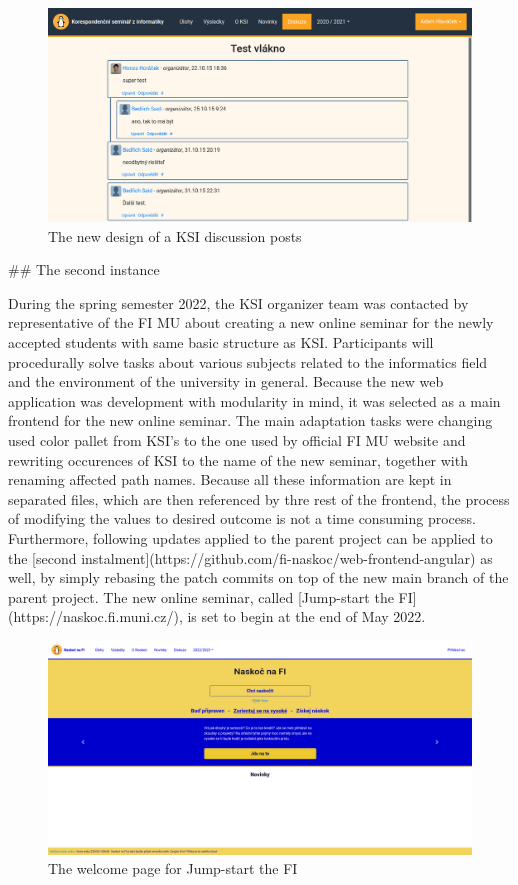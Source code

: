\documentclass[
  digital, %
  oneside, %
  lof,     %
  nolot,     %
]{fithesis4}
\begin{document}
{\begin{figure}
\includegraphics[width=\textwidth]{assets/img/discussion-new}
\caption{The new design of a KSI discussion posts}
\label{fig:discuss-new}
\end{figure}

## The second instance

During the spring semester 2022, the KSI organizer team was contacted by representative of the FI MU about creating a new online seminar for the newly accepted students with same basic structure as KSI. Participants will procedurally solve tasks about various subjects related to the informatics field and the environment of the university in general. Because the new web application was development with modularity in mind, it was selected as a main frontend for the new online seminar. The main adaptation tasks were changing used color pallet from KSI's to the one used by official FI MU website and rewriting occurences of KSI to the name of the new seminar, together with renaming affected path names. Because all these information are kept in separated files, which are then referenced by thre rest of the frontend, the process of modifying the values to desired outcome is not a time consuming process. Furthermore, following updates applied to the parent project can be applied to the [second instalment](https://github.com/fi-naskoc/web-frontend-angular) as well, by simply rebasing the patch commits on top of the new main branch of the parent project. The new online seminar, called [Jump-start the FI](https://naskoc.fi.muni.cz/), is set to begin at the end of May 2022.

\begin{figure}
\includegraphics[width=\textwidth]{assets/img/naskoc-na-fi}
\caption{The welcome page for Jump-start the FI}
\label{fig:naskoc-na-fi}
\end{figure}

}
\end{document}
